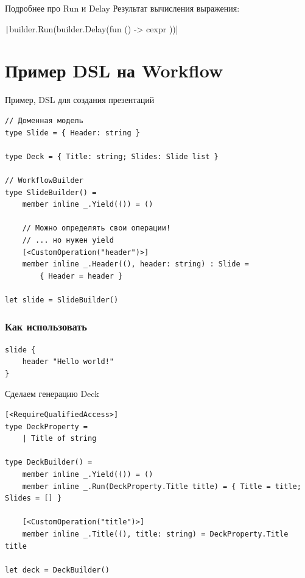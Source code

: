 \documentclass{../../slides-style}
\begin{document}
    \begin{frame}{Подробнее про Run и Delay}
        Результат вычисления выражения:

        \vspace{1cm}

        \begin{center}
            \texttt|builder.Run(builder.Delay(fun () -> {{ cexpr }}))|
        \end{center}
    \end{frame}

    \section{Пример DSL на Workflow}

    \begin{frame}[fragile]{Пример, DSL для создания презентаций}
        \begin{verbatim}
// Доменная модель
type Slide = { Header: string }

type Deck = { Title: string; Slides: Slide list }

// WorkflowBuilder
type SlideBuilder() =
    member inline _.Yield(()) = ()

    // Можно определять свои операции!
    // ... но нужен yield
    [<CustomOperation("header")>]
    member inline _.Header((), header: string) : Slide = 
        { Header = header }

let slide = SlideBuilder()
        \end{verbatim}
    \end{frame}

    \begin{frame}[fragile]
        \frametitle{Как использовать}
        \begin{verbatim}
slide {
    header "Hello world!"
}
        \end{verbatim}
    \end{frame}

    \begin{frame}[fragile]{Сделаем генерацию Deck}
        \begin{verbatim}
[<RequireQualifiedAccess>]
type DeckProperty =
    | Title of string

type DeckBuilder() =
    member inline _.Yield(()) = ()
    member inline _.Run(DeckProperty.Title title) = { Title = title; Slides = [] }

    [<CustomOperation("title")>]
    member inline _.Title((), title: string) = DeckProperty.Title title

let deck = DeckBuilder()
        \end{verbatim}
    \end{frame}
\end{document}
